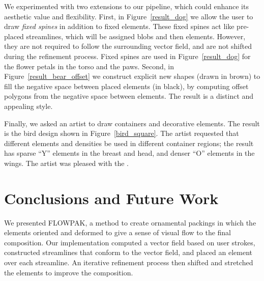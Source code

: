 We experimented with two extensions to our pipeline, 
which could enhance its aesthetic value and flexibility.
First, in Figure~\ref{result_dog} we allow the user to draw 
\textit{fixed spines} in addition to fixed elements.  These fixed
spines act like pre-placed streamlines, which will be assigned blobs
and then elements.  However, they are not required to follow the
surrounding vector field, and are not shifted during the refinement
process.  Fixed spines are used in Figure~\ref{result_dog} for the 
flower petals in the torso and the paws.
Second, in Figure~\ref{result_bear_offset} we construct explicit new shapes
(drawn in brown)
to fill the negative space between placed elements (in black), 
by computing offset polygons from the negative space between elements. 
The result is a distinct and appealing style.  

Finally, we asked an artist to draw containers and decorative elements.
The result is the bird design shown in Figure~\ref{bird_square}.
The artist requested that different elements and densities be used in 
different container regions; the result has sparse ``Y'' elements in 
the breast and head, and denser ``O'' elements in the wings. The artist was pleased with the .





\section{Conclusions and Future Work}
\label{flowpak_conclusions}

\newtext
{
We presented FLOWPAK, a method to create ornamental packings
in which the elements  oriented and deformed to give a sense of visual flow to the final composition.
Our implementation computed a vector field based on user strokes,
constructed streamlines that conform to the vector field, and placed an
element over each streamline. An iterative refinement process then
shifted and stretched the elements to improve the composition.
}

